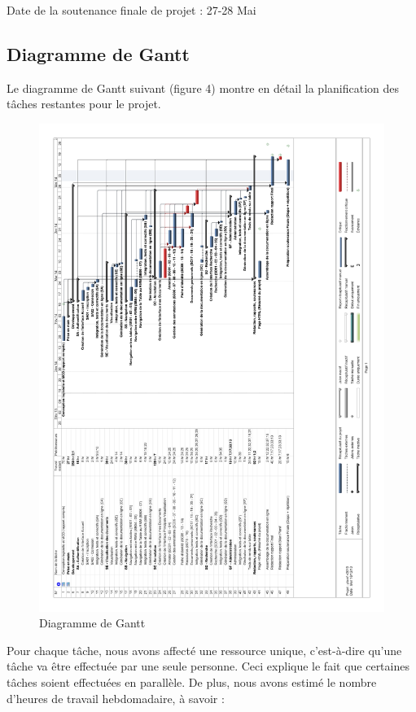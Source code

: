 \documentclass[a4paper]{article}
\begin{document}
	Date de la soutenance finale de projet : 27-28 Mai\\

\subsection{Diagramme de Gantt}

	Le diagramme de Gantt suivant (figure 4) montre en détail la planification des tâches restantes pour le projet.

\begin{figure}[H]
\centering
\includegraphics[width=\textwidth]{gantt.png}
\caption{Diagramme de Gantt}
\label{fig:gantt}
\end{figure}

\newpage

	Pour chaque tâche, nous avons affecté une ressource unique, c'est-à-dire qu'une tâche va être effectuée par une seule personne. Ceci explique le fait que certaines tâches soient effectuées en parallèle. De plus, nous avons estimé le nombre d'heures de travail hebdomadaire, à savoir : 
	
\end{document}
